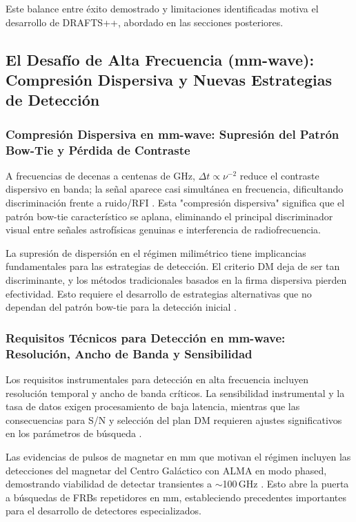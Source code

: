 Este balance entre éxito demostrado y limitaciones identificadas motiva el desarrollo de DRAFTS++, abordado en las secciones posteriores.

\subsection{El Desafío de Alta Frecuencia (mm-wave): Compresión Dispersiva y Nuevas Estrategias de Detección}

\subsubsection{Compresión Dispersiva en mm-wave: Supresión del Patrón Bow-Tie y Pérdida de Contraste}

A frecuencias de decenas a centenas de GHz, $\Delta t\propto \nu^{-2}$ reduce el contraste dispersivo en banda; la señal aparece casi simultánea en frecuencia, dificultando discriminación frente a ruido/RFI \citep{LorimerKramer2004,CordesChatterjee2019}. Esta "compresión dispersiva" significa que el patrón bow-tie característico se aplana, eliminando el principal discriminador visual entre señales astrofísicas genuinas e interferencia de radiofrecuencia.

La supresión de dispersión en el régimen milimétrico tiene implicancias fundamentales para las estrategias de detección. El criterio DM deja de ser tan discriminante, y los métodos tradicionales basados en la firma dispersiva pierden efectividad. Esto requiere el desarrollo de estrategias alternativas que no dependan del patrón bow-tie para la detección inicial \citep{veracasanova2025}.

\subsubsection{Requisitos Técnicos para Detección en mm-wave: Resolución, Ancho de Banda y Sensibilidad}

Los requisitos instrumentales para detección en alta frecuencia incluyen resolución temporal y ancho de banda críticos. La sensibilidad instrumental y la tasa de datos exigen procesamiento de baja latencia, mientras que las consecuencias para S/N y selección del plan DM requieren ajustes significativos en los parámetros de búsqueda \citep{veracasanova2025}.

Las evidencias de pulsos de magnetar en mm que motivan el régimen incluyen las detecciones del magnetar del Centro Galáctico con ALMA en modo phased, demostrando viabilidad de detectar transientes a $\sim$100\,GHz \citep{veracasanova2025}. Esto abre la puerta a búsquedas de FRBs repetidores en mm, estableciendo precedentes importantes para el desarrollo de detectores especializados.

